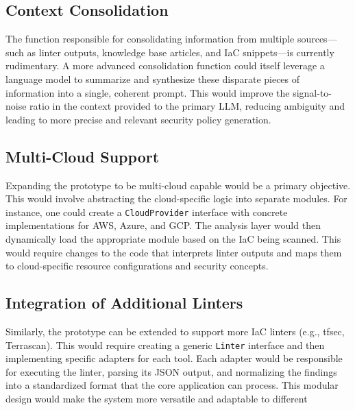 \subsection{Context Consolidation}
The function responsible for consolidating information from multiple sources—such as linter outputs, knowledge base articles, and IaC snippets—is currently rudimentary. A more advanced consolidation function could itself leverage a language model to summarize and synthesize these disparate pieces of information into a single, coherent prompt. This would improve the signal-to-noise ratio in the context provided to the primary LLM, reducing ambiguity and leading to more precise and relevant security policy generation.

\subsection{Multi-Cloud Support}
Expanding the prototype to be multi-cloud capable would be a primary objective. This would involve abstracting the cloud-specific logic into separate modules. For instance, one could create a \texttt{CloudProvider} interface with concrete implementations for AWS, Azure, and GCP. The analysis layer would then dynamically load the appropriate module based on the IaC being scanned. This would require changes to the code that interprets linter outputs and maps them to cloud-specific resource configurations and security concepts.

\subsection{Integration of Additional Linters}
Similarly, the prototype can be extended to support more IaC linters (e.g., tfsec, Terrascan). This would require creating a generic \texttt{Linter} interface and then implementing specific adapters for each tool. Each adapter would be responsible for executing the linter, parsing its JSON output, and normalizing the findings into a standardized format that the core application can process. This modular design would make the system more versatile and adaptable to different
